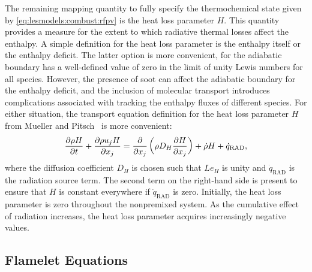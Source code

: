 The remaining mapping quantity to fully specify the thermochemical state given by \cref{eq:lesmodels:combust:rfpv} is the heat loss parameter $H$. This quantity provides a measure for the extent to which radiative thermal losses affect the enthalpy. A simple definition for the heat loss parameter is the enthalpy itself or the enthalpy deficit. The latter option is more convenient, for the adiabatic boundary has a well-defined value of zero in the limit of unity Lewis numbers for all species. However, the presence of soot can affect the adiabatic boundary for the enthalpy deficit, and the inclusion of molecular transport introduces complications associated with tracking the enthalpy fluxes of different species. For either situation, the transport equation definition for the heat loss parameter $H$ from Mueller and Pitsch~\cite{mueller2012} is more convenient:
\begin{equation}\label{eq:lesmodels:combust:map:heatloss}
  \trder{H} = \pder[]{x_j}\left( \rho D_H \pder[H]{x_j} \right) + \dot{\rho}H + \dot{q}_{\text{RAD}},
\end{equation}
where the diffusion coefficient $D_H$ is chosen such that $Le_H$ is unity and $\dot{q}_{\text{RAD}}$ is the radiation source term. The second term on the right-hand side is present to ensure that $H$ is constant everywhere if $\dot{q}_{\text{RAD}}$ is zero. Initially, the heat loss parameter is zero throughout the nonpremixed system. As the cumulative effect of radiation increases, the heat loss parameter acquires increasingly negative values.


\subsection{Flamelet Equations}
\label{sec:lesmodels:combust:flamelet}

